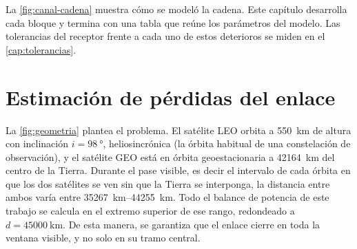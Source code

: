 La \cref{fig:canal-cadena} muestra c\'omo se model\'o la cadena. Este
cap\'itulo desarrolla cada bloque y termina con una tabla que re\'une los
par\'ametros del modelo. Las tolerancias del receptor frente a cada uno de
estos deterioros se miden en el \cref{cap:tolerancias}.

\section{Estimaci\'on de p\'erdidas del enlace}
\label{sec:canal-geometria}

La \cref{fig:geometria} plantea el problema. El sat\'elite LEO orbita a
\SI{550}{\kilo\metre} de altura con inclinaci\'on $i=\SI{98}{\degree}$, heliosincr\'onica (la \'orbita habitual de una constelaci\'on de
observaci\'on), y el sat\'elite GEO est\'a en \'orbita geoestacionaria a
\SI{42164}{\kilo\metre} del centro de la Tierra. Durante el pase visible, es decir el intervalo de cada \'orbita en que los dos
sat\'elites se ven sin que la Tierra se interponga, la distancia entre ambos
var\'ia entre \SIrange{35267}{44255}{\kilo\metre}. Todo el balance de potencia de este
trabajo se calcula en el extremo superior de ese rango, redondeado a
$d = \SI{45000}{\kilo\metre}$. De esta manera, se garantiza que el enlace cierre en toda la
ventana visible, y no solo en su tramo central. 

